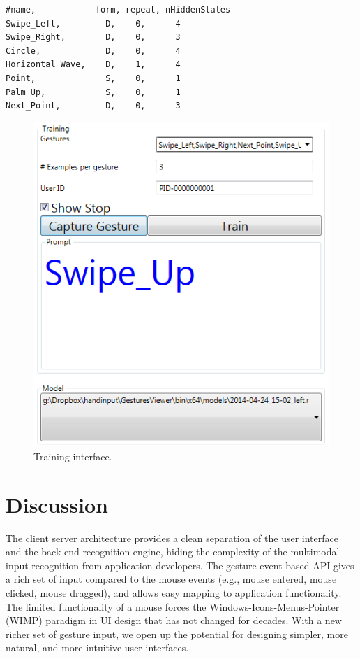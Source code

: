 \begin{lstlisting}[caption={Gesture definition file.},
label={lst:gesture-def}] 
#name,            form, repeat, nHiddenStates
Swipe_Left,         D,    0,      4
Swipe_Right,        D,    0,      3
Circle,             D,    0,      4
Horizontal_Wave,    D,    1,      4
Point,              S,    0,      1
Palm_Up,            S,    0,      1
Next_Point,         D,    0,      3
\end{lstlisting}

\begin{figure}[tbh]
\centering
\includegraphics[width=0.5\columnwidth]{figures/training_interface.PNG}
\caption{Training interface.}
\label{fig:training}
\end{figure}

\section{Discussion}
The client server architecture provides a clean separation of the user
interface and the back-end recognition engine, hiding the complexity of the
multimodal input recognition from application developers. The gesture event
based API gives a rich set of input compared to the mouse events (e.g., mouse
entered, mouse clicked, mouse dragged), and allows easy mapping to application
functionality. The limited functionality of a mouse forces the
Windows-Icons-Menus-Pointer (WIMP) paradigm in UI design that has not changed
for decades. With a new richer set of gesture input, we open up the
potential for designing simpler,  more natural, and more intuitive user
interfaces.


